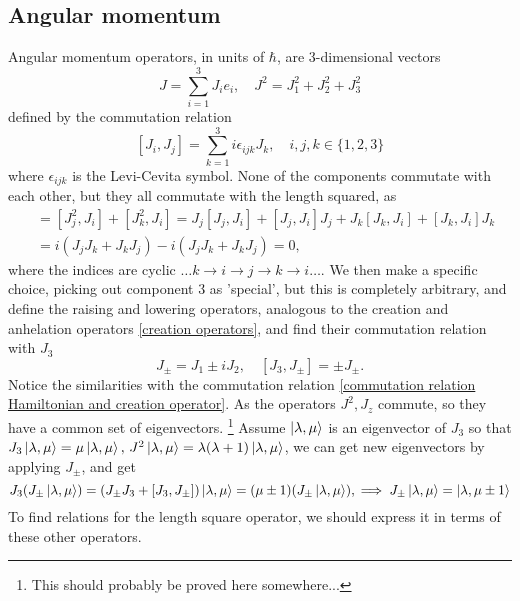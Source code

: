 \subsection{Angular momentum}
Angular momentum operators, in units of $\hbar$, are 3-dimensional vectors
\begin{equation*}
    J = \sum_{i=1}^3 J_i e_i, \quad J^2 = J_1^2 + J_2^2 + J_3^2
\end{equation*} defined by the commutation relation
\begin{equation}
    \label{commutatino relation angular momentum}
    [J_i, J_j] = \sum_{k=1}^3i \epsilon_{ijk} J_k, \quad i,j,k \in \{1, 2, 3\}
\end{equation}
where $\epsilon_{ijk}$ is the Levi-Cevita symbol. None of the components commutate with each other, but they all commutate with the length squared, as
\begin{align*}
    [J^2, J_i] & = [J_j^2, J_i] + [J_k^2, J_i] = J_j[J_j, J_i] + [J_j, J_i]J_j + J_k[J_k, J_i] + [J_k, J_i]J_k \\ 
    &= i(J_jJ_k + J_kJ_j) - i(J_jJ_k + J_kJ_j) = 0,
\end{align*}
where the indices are cyclic $\dots k \rightarrow i \rightarrow j \rightarrow k \rightarrow i \dots$. We then make a specific choice, picking out component $3$ as 'special', but this is completely arbitrary, and define the raising and lowering operators, analogous to the creation and anhelation operators \eqref{creation operators}, and find their commutation relation with $J_3$
\begin{equation}
    \label{angular momentum creation operators}
    J_\pm = J_1 \pm i J_2, \quad [J_3, J_\pm] = \pm J_\pm.
\end{equation}
Notice the similarities with the commutation relation \eqref{commutation relation Hamiltonian and creation operator}. As the operators $J^2, J_ z$ commute, so they have a common set of eigenvectors. \footnote{This should probably be proved here somewhere...} Assume $\ket{\lambda, \mu}$ is an eigenvector of $ J_3$ so that $J_3 \ket{\lambda, \mu} = \mu \ket{\lambda, \mu}, \, J^2 \ket{\lambda, \mu} = \lambda(\lambda + 1) \ket{\lambda, \mu}$, we can get new eigenvectors by applying $J_\pm$, and get
\begin{equation*}
    J_3(J_\pm \ket{\lambda, \mu}) = (J_\pm J_3 + [J_3, J_\pm]) \ket{\lambda, \mu} = (\mu \pm 1)(J_\pm \ket{\lambda, \mu}), \implies J_\pm \ket{\lambda, \mu} = \ket{\lambda, \mu \pm 1}
\end{equation*}
To find relations for the length square operator, we should express it in terms of these other operators.
